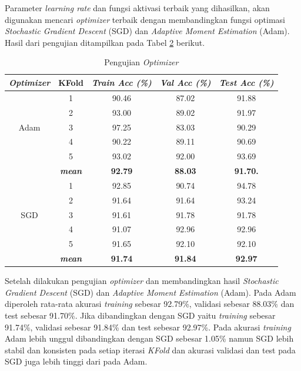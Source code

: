 \begin{table}[H]
    Parameter \textit{learning rate} dan fungsi aktivasi terbaik yang dihasilkan, akan digunakan mencari \textit{optimizer} terbaik dengan membandingkan fungsi optimasi \textit{Stochastic Gradient Descent} (SGD) dan \textit{Adaptive Moment Estimation} (Adam). Hasil dari pengujian ditampilkan pada Tabel \ref{Pengujian Optimizer} berikut.

        \begin{table}[H]
        \centering
        \caption{Pengujian \textit{Optimizer}}
        \begin{tabular}{ccccc}
            \toprule
            \textbf{\textit{Optimizer}} & \multicolumn{1}{c}{\textbf{KFold}} & \textbf{\textit{Train Acc (\%) } } & \textbf{\textit{Val Acc (\%)}} & \textbf{\textit{Test Acc (\%)}}\\
        
            \midrule
            \multirow{5}{*}{Adam} 
            & 1 & 90.46 & 87.02 & 91.88 \\
            & 2 & 93.00 & 89.02 & 91.97 \\
            & 3 & 97.25 & 83.03 & 90.29 \\
            & 4 & 90.22 & 89.11 & 90.69 \\
            & 5 & 93.02 & 92.00 & 93.69 \\ 
            & \textit{\textbf{mean}}& \textbf{92.79} & \textbf{88.03} &\textbf{91.70.} \\ 
            \hline

    
            \multirow{5}{*}{SGD}
            & 1 & 92.85 & 90.74 & 94.78 \\
            & 2 & 91.64 & 91.64 & 93.24 \\
            & 3 & 91.61 & 91.78 & 91.78 \\
            & 4 & 91.07 & 92.96 & 92.96 \\
            & 5 & 91.65 & 92.10 & 92.10  \\
            & \textit{\textbf{mean}}& \textbf{91.74} & \textbf{91.84} &\textbf{92.97} \\ 
    

            \bottomrule
        \end{tabular}
        \label{Pengujian Optimizer}
    \end{table}


    Setelah dilakukan pengujian \textit{optimizer} dan membandingkan hasil \textit{Stochastic Gradient Descent} (SGD) dan \textit{Adaptive Moment Estimation} (Adam). Pada Adam diperoleh rata-rata akurasi \textit{training} sebesar 92.79\%, validasi sebesar 88.03\% dan test sebesar 91.70\%. Jika dibandingkan dengan SGD yaitu \textit{training} sebesar 91.74\%, validasi sebesar 91.84\% dan test sebesar 92.97\%. Pada akurasi \textit{training} Adam lebih unggul dibandingkan dengan SGD sebesar 1.05\% namun SGD lebih stabil dan konsisten pada setiap iterasi \textit{KFold} dan akurasi validasi dan test pada SGD juga lebih tinggi dari pada Adam.
    


\end{table}
